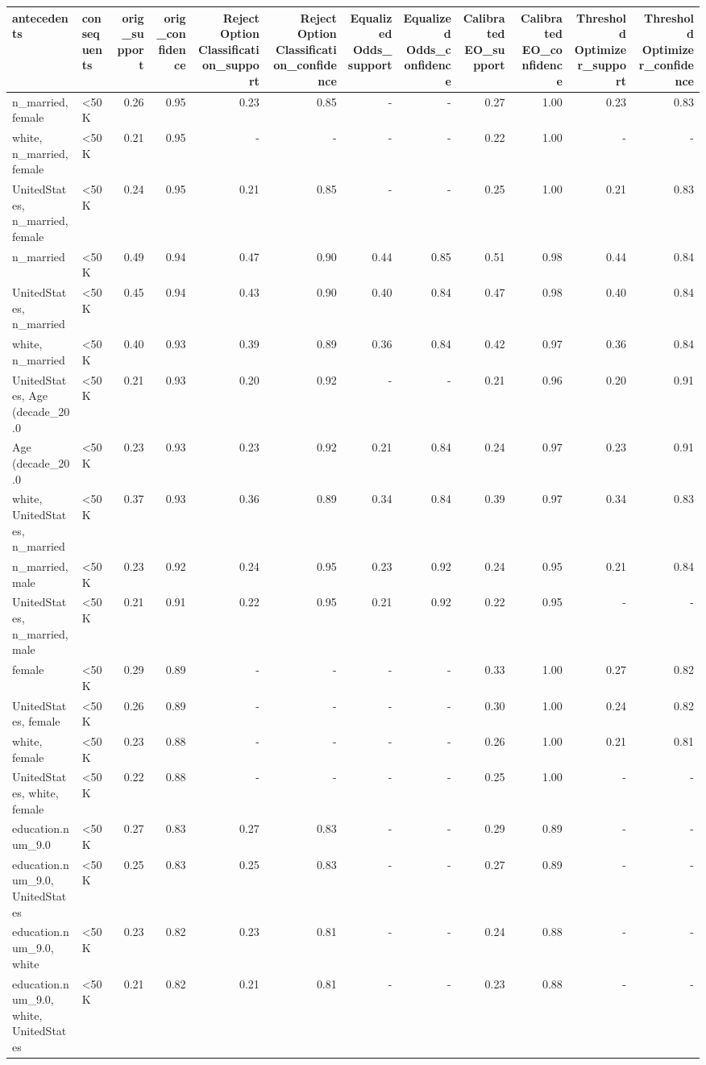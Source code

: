 \begin{tabular}{llrrrrrrrrrr}
\toprule
antecedents & consequents & orig\_support & orig\_confidence & Reject Option Classification\_support & Reject Option Classification\_confidence & Equalized Odds\_support & Equalized Odds\_confidence & Calibrated EO\_support & Calibrated EO\_confidence & Threshold Optimizer\_support & Threshold Optimizer\_confidence \\
\midrule
n\_married, female & <50K & 0.26 & 0.95 & 0.23 & 0.85 & - & - & 0.27 & 1.00 & 0.23 & 0.83 \\
white, n\_married, female & <50K & 0.21 & 0.95 & - & - & - & - & 0.22 & 1.00 & - & - \\
UnitedStates, n\_married, female & <50K & 0.24 & 0.95 & 0.21 & 0.85 & - & - & 0.25 & 1.00 & 0.21 & 0.83 \\
n\_married & <50K & 0.49 & 0.94 & 0.47 & 0.90 & 0.44 & 0.85 & 0.51 & 0.98 & 0.44 & 0.84 \\
UnitedStates, n\_married & <50K & 0.45 & 0.94 & 0.43 & 0.90 & 0.40 & 0.84 & 0.47 & 0.98 & 0.40 & 0.84 \\
white, n\_married & <50K & 0.40 & 0.93 & 0.39 & 0.89 & 0.36 & 0.84 & 0.42 & 0.97 & 0.36 & 0.84 \\
UnitedStates, Age (decade\_20.0 & <50K & 0.21 & 0.93 & 0.20 & 0.92 & - & - & 0.21 & 0.96 & 0.20 & 0.91 \\
Age (decade\_20.0 & <50K & 0.23 & 0.93 & 0.23 & 0.92 & 0.21 & 0.84 & 0.24 & 0.97 & 0.23 & 0.91 \\
white, UnitedStates, n\_married & <50K & 0.37 & 0.93 & 0.36 & 0.89 & 0.34 & 0.84 & 0.39 & 0.97 & 0.34 & 0.83 \\
n\_married, male & <50K & 0.23 & 0.92 & 0.24 & 0.95 & 0.23 & 0.92 & 0.24 & 0.95 & 0.21 & 0.84 \\
UnitedStates, n\_married, male & <50K & 0.21 & 0.91 & 0.22 & 0.95 & 0.21 & 0.92 & 0.22 & 0.95 & - & - \\
female & <50K & 0.29 & 0.89 & - & - & - & - & 0.33 & 1.00 & 0.27 & 0.82 \\
UnitedStates, female & <50K & 0.26 & 0.89 & - & - & - & - & 0.30 & 1.00 & 0.24 & 0.82 \\
white, female & <50K & 0.23 & 0.88 & - & - & - & - & 0.26 & 1.00 & 0.21 & 0.81 \\
UnitedStates, white, female & <50K & 0.22 & 0.88 & - & - & - & - & 0.25 & 1.00 & - & - \\
education.num\_9.0 & <50K & 0.27 & 0.83 & 0.27 & 0.83 & - & - & 0.29 & 0.89 & - & - \\
education.num\_9.0, UnitedStates & <50K & 0.25 & 0.83 & 0.25 & 0.83 & - & - & 0.27 & 0.89 & - & - \\
education.num\_9.0, white & <50K & 0.23 & 0.82 & 0.23 & 0.81 & - & - & 0.24 & 0.88 & - & - \\
education.num\_9.0, white, UnitedStates & <50K & 0.21 & 0.82 & 0.21 & 0.81 & - & - & 0.23 & 0.88 & - & - \\
\bottomrule
\end{tabular}
